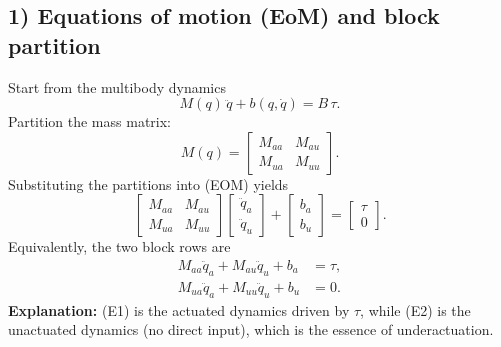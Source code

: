 \subsection*{1) Equations of motion (EoM) and block partition}
Start from the multibody dynamics
\begin{equation}
M(q)\,\ddot q + b(q,\dot q) = B\,\tau.
\tag{EOM}
\end{equation}
Partition the mass matrix:
\begin{equation}
M(q)=
\begin{bmatrix}
M_{aa} & M_{au}\\
M_{ua} & M_{uu}
\end{bmatrix}.
\end{equation}
Substituting the partitions into (EOM) yields
\begin{equation}
\begin{bmatrix}
M_{aa} & M_{au}\\
M_{ua} & M_{uu}
\end{bmatrix}
\begin{bmatrix}
\ddot q_a\\
\ddot q_u
\end{bmatrix}
+
\begin{bmatrix}
b_a\\
b_u
\end{bmatrix}
=
\begin{bmatrix}
\tau\\
0
\end{bmatrix}.
\end{equation}
Equivalently, the two block rows are
\begin{align}
M_{aa}\ddot q_a + M_{au}\ddot q_u + b_a &= \tau,
\tag{E1}\\
M_{ua}\ddot q_a + M_{uu}\ddot q_u + b_u &= 0.
\tag{E2}
\end{align}
\noindent
\textbf{Explanation:} (E1) is the actuated dynamics driven by $\tau$, while (E2) is the unactuated dynamics (no direct input), which is the essence of underactuation.

